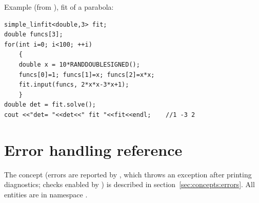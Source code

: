 Example (from ), fit of a parabola:
\begin{lstlisting}
simple_linfit<double,3> fit;
double funcs[3];
for(int i=0; i<100; ++i)
	{
	double x = 10*RANDDOUBLESIGNED();
	funcs[0]=1; funcs[1]=x; funcs[2]=x*x;
	fit.input(funcs, 2*x*x-3*x+1);
	}
double det = fit.solve();
cout <<"det= "<<det<<" fit "<<fit<<endl;    //1 -3 2
\end{lstlisting}

\section{Error handling reference}\label{sec:utilities:errors}

The concept (errors are reported by , which throws an exception after printing diagnostics; checks enabled by
) is described in section~\ref{sec:concepts:errors}. All entities are in namespace .


